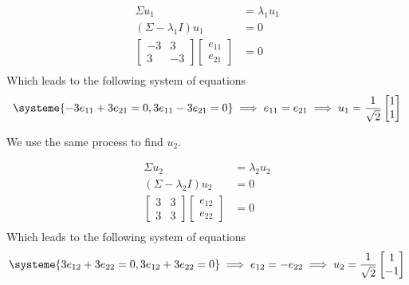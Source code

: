 \documentclass[a4paper, 10pt, twoside]{article}
\begin{document}
\begin{enumerate}[a)]
          \begin{align*}
              \Sigma u_1                 & = \lambda_1 u_1 \\
              (\Sigma - \lambda_1 I) u_1 & = 0             \\
              \begin{bmatrix}
                  -3 & 3  \\
                  3  & -3
              \end{bmatrix}
              \begin{bmatrix}
                  e_{11} \\ e_{21}
              \end{bmatrix} & = 0             \\
          \end{align*}
          Which leads to the following system of equations
          \begin{align*}
              \systeme{
                  -3 e_{11} + 3 e_{21} = 0,
                  3 e_{11} - 3 e_{21} = 0
              }
              \implies e_{11} = e_{21}
              \implies u_1 = \frac{1}{\sqrt{2}}\begin{bmatrix}1 \\ 1\end{bmatrix}
          \end{align*}

          We use the same process to find $u_2$.

          \begin{align*}
              \Sigma u_2                 & = \lambda_2 u_2 \\
              (\Sigma - \lambda_2 I) u_2 & = 0             \\
              \begin{bmatrix}
                  3 & 3 \\
                  3 & 3
              \end{bmatrix}
              \begin{bmatrix}
                  e_{12} \\ e_{22}
              \end{bmatrix} & = 0             \\
          \end{align*}
          Which leads to the following system of equations
          \begin{align*}
              \systeme{
                  3 e_{12} + 3 e_{22} = 0,
                  3 e_{12} + 3 e_{22} = 0
              }
              \implies e_{12} = - e_{22}
              \implies u_2 = \frac{1}{\sqrt{2}}\begin{bmatrix}1 \\ -1\end{bmatrix}
          \end{align*}


\end{enumerate}
\end{document}
